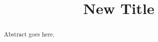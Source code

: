 \documentclass[conference]{IEEEtran}
\begin{document}
\title{New Title}
\author{\authors}

\maketitle

\begin{abstract}
  Abstract goes here.
\end{abstract}

\IEEEpeerreviewmaketitle








\end{document}

